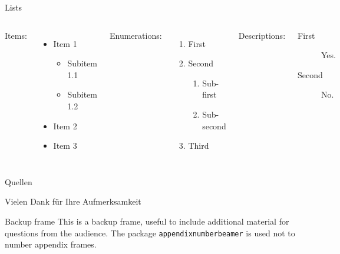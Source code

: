 \documentclass{beamer}
\begin{document}
    \begin{frame}{Lists}
        \begin{columns}[t, onlytextwidth]
                Items:
                \begin{itemize}
                    \item Item 1
                    \begin{itemize}
                        \item Subitem 1.1
                        \item Subitem 1.2
                    \end{itemize}
                    \item Item 2
                    \item Item 3
                \end{itemize}
            
                Enumerations:
                \begin{enumerate}
                    \item First
                    \item Second
                    \begin{enumerate}
                        \item Sub-first
                        \item Sub-second
                    \end{enumerate}
                    \item Third
                \end{enumerate}
            
                Descriptions:
                \begin{description}
                    \item[First] Yes.
                    \item[Second] No.
                \end{description}
        \end{columns}
    \end{frame}

	 \appendix
	\begin{frame}{Quellen}
	\nocite{*}
	
	
	\end{frame}
    \begin{frame}[focus]
        Vielen Dank für Ihre Aufmerksamkeit
    \end{frame}
    
   
    
    \begin{frame}{Backup frame}
        This is a backup frame, useful to include additional material for questions from the audience.
        \vfill
        The package \texttt{appendixnumberbeamer} is used not to number appendix frames.
    \end{frame}
\end{document}
